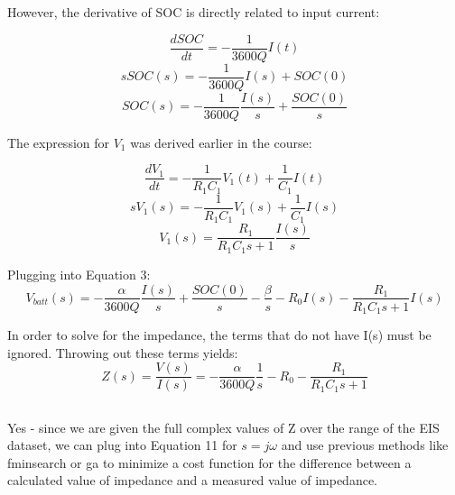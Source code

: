\documentclass[a4paper,12pt]{extarticle}
\begin{document}
However, the derivative of SOC is directly related to input current:

\begin{equation}
\frac{dSOC}{dt} = -\frac{1}{3600Q}I(t)
\end{equation}
\begin{equation}
sSOC(s) = -\frac{1}{3600Q}I(s) + SOC(0)
\end{equation}
\begin{equation}
SOC(s) = -\frac{1}{3600Q}\frac{I(s)}{s} + \frac{SOC(0)}{s}
\end{equation}

The expression for \(V_1\) was derived earlier in the course:

\begin{equation} \label{}
\frac{dV_1}{dt} = -\frac{1}{R_1C_1}V_1(t) + \frac{1}{C_1}I(t)
\end{equation}
\begin{equation} \label{}
sV_1(s) = -\frac{1}{R_1C_1}V_1(s) + \frac{1}{C_1}I(s)
\end{equation}
\begin{equation}
V_1(s) = \frac{R_1}{R_1C_1s + 1}\frac{I(s)}{s}
\end{equation}

Plugging into Equation 3:
\begin{equation}
V_{batt}(s) = -\frac{\alpha}{3600Q}\frac{I(s)}{s} + \frac{SOC(0)}{s} - \frac{\beta}{s} - R_0I(s) - \frac{R_1}{R_1C_1s + 1}I(s)
\end{equation}

In order to solve for the impedance, the terms that do not have I(s) must be ignored. Throwing out these terms yields:
\begin{equation}
Z(s) = \frac{V(s)}{I(s)} = -\frac{\alpha}{3600Q}\frac{1}{s} - R_0 - \frac{R_1}{R_1C_1s + 1}
\end{equation}

\subsection{}
Yes - since we are given the full complex values of Z over the range of the EIS dataset, we can plug into Equation 11 for \(s = j\omega\) and use previous methods like fminsearch or ga to minimize a cost function for the difference between a calculated value of impedance and a measured value of impedance. 

\subsection{}
\end{document}
